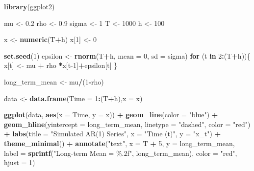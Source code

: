\documentclass[
]{article}
\newenvironment{Shaded}{\begin{snugshade}}{\end{snugshade}}
\newcommand{\AttributeTok}[1]{\textcolor[rgb]{0.13,0.29,0.53}{#1}}
\newcommand{\ControlFlowTok}[1]{\textcolor[rgb]{0.13,0.29,0.53}{\textbf{#1}}}
\newcommand{\DecValTok}[1]{\textcolor[rgb]{0.00,0.00,0.81}{#1}}
\newcommand{\FloatTok}[1]{\textcolor[rgb]{0.00,0.00,0.81}{#1}}
\newcommand{\FunctionTok}[1]{\textcolor[rgb]{0.13,0.29,0.53}{\textbf{#1}}}
\newcommand{\NormalTok}[1]{#1}
\newcommand{\OtherTok}[1]{\textcolor[rgb]{0.56,0.35,0.01}{#1}}
\newcommand{\SpecialCharTok}[1]{\textcolor[rgb]{0.81,0.36,0.00}{\textbf{#1}}}
\newcommand{\StringTok}[1]{\textcolor[rgb]{0.31,0.60,0.02}{#1}}
\begin{document}
\begin{Shaded}
\begin{Highlighting}[]
\FunctionTok{library}\NormalTok{(ggplot2)}

\NormalTok{mu }\OtherTok{\textless{}{-}} \FloatTok{0.2}
\NormalTok{rho }\OtherTok{\textless{}{-}} \FloatTok{0.9}
\NormalTok{sigma }\OtherTok{\textless{}{-}} \DecValTok{1}
\NormalTok{T }\OtherTok{\textless{}{-}} \DecValTok{1000}
\NormalTok{h }\OtherTok{\textless{}{-}} \DecValTok{100}


\NormalTok{x }\OtherTok{\textless{}{-}} \FunctionTok{numeric}\NormalTok{(T}\SpecialCharTok{+}\NormalTok{h)}
\NormalTok{x[}\DecValTok{1}\NormalTok{] }\OtherTok{\textless{}{-}} \DecValTok{0}

\FunctionTok{set.seed}\NormalTok{(}\DecValTok{1}\NormalTok{)}
\NormalTok{epsilon }\OtherTok{\textless{}{-}} \FunctionTok{rnorm}\NormalTok{(T}\SpecialCharTok{+}\NormalTok{h, }\AttributeTok{mean =} \DecValTok{0}\NormalTok{, }\AttributeTok{sd =}\NormalTok{ sigma)}
\ControlFlowTok{for}\NormalTok{ (t }\ControlFlowTok{in} \DecValTok{2}\SpecialCharTok{:}\NormalTok{(T}\SpecialCharTok{+}\NormalTok{h))\{}
\NormalTok{  x[t] }\OtherTok{\textless{}{-}}\NormalTok{ mu }\SpecialCharTok{+}\NormalTok{ rho }\SpecialCharTok{*}\NormalTok{x[t}\DecValTok{{-}1}\NormalTok{]}\SpecialCharTok{+}\NormalTok{epsilon[t]}
\NormalTok{\}}

\NormalTok{long\_term\_mean }\OtherTok{\textless{}{-}}\NormalTok{ mu}\SpecialCharTok{/}\NormalTok{(}\DecValTok{1}\SpecialCharTok{{-}}\NormalTok{rho)}

\NormalTok{data }\OtherTok{\textless{}{-}} \FunctionTok{data.frame}\NormalTok{(}\AttributeTok{Time =} \DecValTok{1}\SpecialCharTok{:}\NormalTok{(T}\SpecialCharTok{+}\NormalTok{h),}\AttributeTok{x =}\NormalTok{ x)}


\FunctionTok{ggplot}\NormalTok{(data, }\FunctionTok{aes}\NormalTok{(}\AttributeTok{x =}\NormalTok{ Time, }\AttributeTok{y =}\NormalTok{ x)) }\SpecialCharTok{+}
  \FunctionTok{geom\_line}\NormalTok{(}\AttributeTok{color =} \StringTok{"blue"}\NormalTok{) }\SpecialCharTok{+}
  \FunctionTok{geom\_hline}\NormalTok{(}\AttributeTok{yintercept =}\NormalTok{ long\_term\_mean, }\AttributeTok{linetype =} \StringTok{"dashed"}\NormalTok{, }\AttributeTok{color =} \StringTok{"red"}\NormalTok{) }\SpecialCharTok{+}
  \FunctionTok{labs}\NormalTok{(}\AttributeTok{title =} \StringTok{"Simulated AR(1) Series"}\NormalTok{,}
       \AttributeTok{x =} \StringTok{"Time (t)"}\NormalTok{, }\AttributeTok{y =} \StringTok{"x\_t"}\NormalTok{) }\SpecialCharTok{+}
  \FunctionTok{theme\_minimal}\NormalTok{() }\SpecialCharTok{+}
  \FunctionTok{annotate}\NormalTok{(}\StringTok{"text"}\NormalTok{, }\AttributeTok{x =}\NormalTok{ T }\SpecialCharTok{+} \DecValTok{5}\NormalTok{, }\AttributeTok{y =}\NormalTok{ long\_term\_mean, }\AttributeTok{label =} \FunctionTok{sprintf}\NormalTok{(}\StringTok{"Long{-}term Mean = \%.2f"}\NormalTok{, long\_term\_mean), }
           \AttributeTok{color =} \StringTok{"red"}\NormalTok{, }\AttributeTok{hjust =} \DecValTok{1}\NormalTok{)}
\end{Highlighting}
\end{Shaded}
\end{document}
